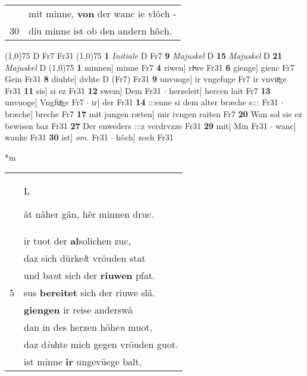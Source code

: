 \documentclass[8pt,a4paper,notitlepage]{article}
\begin{document}
\begin{table}[ht]
\begin{minipage}[t]{0.5\linewidth}
\begin{tabular}{rl}
 & mit minne, \textbf{von} der wanc ie vlôch -\\ 
30 & diu minne ist ob den andern hôch.\\ 
\end{tabular}
\scriptsize
\line(1,0){75} \newline
D Fr7 Fr31 \newline
\line(1,0){75} \newline
\textbf{1} \textit{Initiale} D Fr7  \textbf{9} \textit{Majuskel} D  \textbf{15} \textit{Majuskel} D  \textbf{21} \textit{Majuskel} D  \newline
\line(1,0){75} \newline
\textbf{1} minnen] minne Fr7 \textbf{4} riwen] riͮwe Fr31 \textbf{6} gienge] gienc Fr7 Gein Fr31 \textbf{8} diuhte] dvhte D (Fr7) Fr31 \textbf{9} unvuoge] ir vngefuge Fr7 ir vnvuͦge Fr31 \textbf{11} sis] si ez Fr31 \textbf{12} swem] Dem Fr31  $\cdot$ herzeleit] hercen lait Fr7 \textbf{13} unvuoge] Vngfuͤge Fr7  $\cdot$ ir] der Fr31 \textbf{14} :::enne si dem alter bræche s::: Fr31  $\cdot$ bræche] breche Fr7 \textbf{17} mit jungen ræten] mir ivngen raiten Fr7 \textbf{20} Wan sol sie ez bewisen baz Fr31 \textbf{27} Der enweders :::z verdrvzze Fr31 \textbf{29} mit] Min Fr31  $\cdot$ wanc] wanke Fr31 \textbf{30} ist] \textit{om.} Fr31  $\cdot$ hôch] zoch Fr31 \newline
\end{minipage}
\hspace{0.5cm}
\begin{minipage}[t]{0.5\linewidth}
\small
\begin{center}*m
\end{center}
\begin{tabular}{rl}
 & \begin{large}L\end{large}ât nâher gân, hêr minnen druc.\\ 
 & ir tuot der  \textbf{al}solichen zuc,\\ 
 & daz sich dürke\textit{l}t vröuden stat\\ 
 & und ba\textit{n}t sich der \textbf{riuwen} pfat.\\ 
5 & sus \textbf{bereitet} sich der riuwe slâ.\\ 
 & \textbf{giengen} ir reise anderswâ\\ 
 & dan in des herzen hôhe\textit{n} muot,\\ 
 & daz d\textit{iu}hte mich gegen vröuden guot.\\ 
 & ist minne \textbf{ir} ungevüege balt,\\ 

\end{tabular}
\end{minipage}
\end{table}
\end{document}
